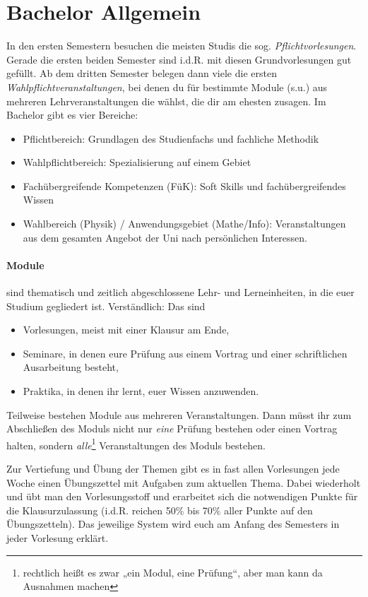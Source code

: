 \section{Bachelor Allgemein}
In den ersten Semestern besuchen die meisten Studis die sog. \emph{Pflichtvorlesungen}. Gerade die ersten beiden Semester sind i.d.R. mit diesen Grundvorlesungen gut gefüllt. Ab dem dritten Semester belegen dann viele die ersten \emph{Wahlpflichtveranstaltungen}, bei denen du für bestimmte Module (s.u.) aus mehreren Lehrveranstaltungen die wählst, die dir am ehesten zusagen. Im Bachelor gibt es vier Bereiche:

\begin{itemize}
	\item Pflichtbereich: Grundlagen des Studienfachs und fachliche Methodik
	\item Wahlpflichtbereich: Spezialisierung auf einem Gebiet
	\item Fachübergreifende Kompetenzen (FüK): Soft Skills und fachübergreifendes Wissen
	\item Wahlbereich (Physik) / Anwendungsgebiet (Mathe/Info): Veranstaltungen aus dem gesamten Angebot der Uni nach persönlichen Interessen.
\end{itemize}

\paragraph*{Module} sind \glqq{}thematisch und zeitlich abgeschlossene Lehr- und Lerneinheiten\grqq{}, in die euer Studium gegliedert ist. Verständlich: Das sind

\begin{itemize}
	\item Vorlesungen, meist mit einer Klausur am Ende,
	\item Seminare, in denen eure Prüfung aus einem Vortrag und einer schriftlichen Ausarbeitung besteht,
	\item Praktika, in denen ihr lernt, euer Wissen anzuwenden.
\end{itemize}

Teilweise bestehen Module aus mehreren Veranstaltungen. Dann müsst ihr zum Abschließen des Moduls nicht nur \textit{eine} Prüfung bestehen oder einen Vortrag halten, sondern \textit{alle}\footnote{rechtlich heißt es zwar „ein Modul, eine Prüfung“, aber man kann da Ausnahmen machen} Veranstaltungen des Moduls bestehen.

Zur Vertiefung und Übung der Themen gibt es in fast allen Vorlesungen jede Woche einen Übungszettel mit Aufgaben zum aktuellen Thema. Dabei wiederholt und übt man den Vorlesungsstoff und erarbeitet sich die notwendigen Punkte für die Klausurzulassung (i.d.R. reichen 50\% bis 70\% aller Punkte auf den Übungszetteln). Das jeweilige System wird euch am Anfang des Semesters in jeder Vorlesung erklärt.

